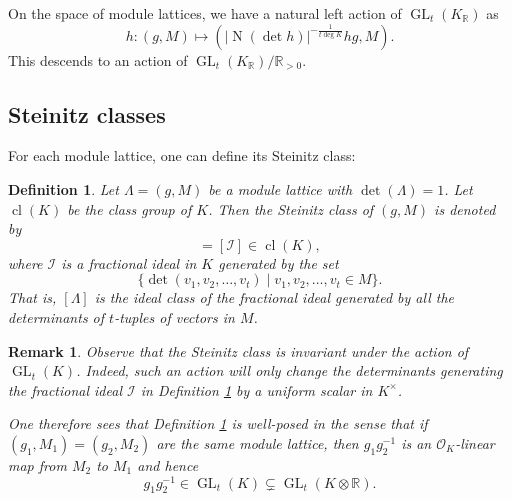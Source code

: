 \documentclass{amsart}
\newtheorem{definition}[theorem]{Definition}
\newtheorem{remark}[theorem]{Remark}
\newcommand{\OK}{\mathcal{O}_K}
\newcommand{\KR}{K_\mathbb{R}}
\DeclareMathOperator{\GL}{GL}
\DeclareMathOperator{\cl}{cl}
\DeclareMathOperator{\N}{N}
\begin{document}
On the space of module lattices, we have a natural left action of $\GL_{t}(\KR)$ as 
\begin{equation}
 h :(g,M)  \mapsto (  |\N(\det h)|^{-\frac{1}{t \deg K}}h g , M).
\end{equation}
This descends to an action of $\GL_t(\KR)/\mathbb{R}_{>0}$.

\subsection{Steinitz classes}

For each module lattice, one can define its Steinitz class:
\begin{definition}
Let $\Lambda = (g,M)$ be a module lattice with $\det(\Lambda)=1$. 
Let $\cl(K)$ be the class group of $K$.
Then the Steinitz class of $(g,M)$ is denoted by 
\begin{equation}
[\Lambda] =  [\mathcal{I}] \in \cl(K),
\end{equation}
where $\mathcal{I}$ is a fractional ideal in $K$ 
generated by the set
\begin{equation}
  \{ \det( v_1,v_2,\dots,v_t) \mid v_1,v_2,\dots,v_t \in M\}.
\end{equation}
That is, $[\Lambda]$ is the ideal class of the fractional ideal generated by all the determinants of $t$-tuples of vectors in $M$.
\label{de:steinitz}
\end{definition}

\begin{remark}
Observe that the Steinitz class is invariant under the action of $\GL_{t}(K)$. 
Indeed, such an action will only change the determinants generating the fractional ideal $\mathcal{I}$ 
in Definition \ref{de:steinitz}
by a uniform scalar in $K^{\times}$. 

One therefore sees that Definition \ref{de:steinitz} is well-posed in the sense that if $(g_1,M_1) = (g_2,M_2)$ are the same module lattice, 
then $g_1g_2^{-1}$ is an $\OK$-linear map from $M_2$ to $M_1$ and hence
\begin{equation}
  g_1g_2^{-1} \in \GL_{t}(K) \subsetneq \GL_{t}(K\otimes \mathbb{R}).
\end{equation}
\end{remark}
\end{document}
